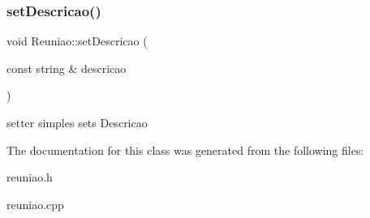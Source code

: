 \subsubsection{\texorpdfstring{set\+Descricao()}{setDescricao()}}
{\footnotesize\ttfamily void Reuniao\+::set\+Descricao (\begin{DoxyParamCaption}\item[{const string \&}]{descricao }\end{DoxyParamCaption})}

setter simples sets Descricao 

The documentation for this class was generated from the following files\+:\begin{DoxyCompactItemize}
\item 
reuniao.\+h\item 
reuniao.\+cpp\end{DoxyCompactItemize}
